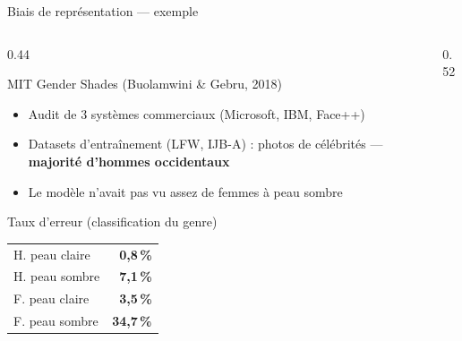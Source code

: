 \documentclass[aspectratio=169, 10pt]{beamer}
\begin{document}
\begin{frame}{Biais de représentation --- exemple}
  \begin{columns}[T]
    \begin{column}{0.44\textwidth}
      \begin{alertblock}{MIT Gender Shades (Buolamwini \& Gebru, 2018)}
        \begin{itemize}
          \item Audit de 3 systèmes commerciaux (Microsoft, IBM, Face++)
          \item Datasets d'entraînement (LFW, IJB-A) : photos de
                célébrités — \textbf{majorité d'hommes occidentaux}
          \item Le modèle n'avait pas vu assez de femmes à peau sombre
        \end{itemize}
      \end{alertblock}
      \begin{block}{Taux d'erreur (classification du genre)}
        {\scriptsize\begin{tabular}{lr}
          H. peau claire & \textbf{0,8\,\%}  \\
          H. peau sombre & \textbf{7,1\,\%}  \\
          F. peau claire & \textbf{3,5\,\%}  \\
          F. peau sombre & \textbf{34,7\,\%} \\
        \end{tabular}}
      \end{block}
    \end{column}
    \begin{column}{0.52\textwidth}
      \begin{center}
\end{center}
\end{column}
\end{columns}
\end{frame}
\end{document}
